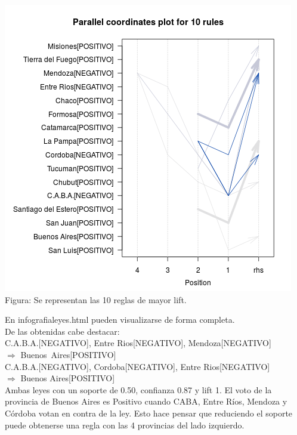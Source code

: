 \documentclass{endm}
\begin{document}
\begin{center}
\includegraphics[scale=0.5]{graficos/paracoordProvincias.png} \\
\scriptsize{Figura: Se representan las 10 reglas de mayor lift.}
\end{center} 

En infografialeyes.html pueden visualizarse de forma completa. \\

De las obtenidas cabe destacar: \\

C.A.B.A.[NEGATIVO], Entre Rios[NEGATIVO], Mendoza[NEGATIVO]\\ $\Longrightarrow$ Buenos\ Aires[POSITIVO] \\

{C.A.B.A.[NEGATIVO],                            Cordoba[NEGATIVO],                              Entre Rios[NEGATIVO]}\\ $\Longrightarrow$ {Buenos Aires[POSITIVO]}  \\


Ambas leyes con un soporte de 0.50, confianza 0.87 y lift 1. El voto de la provincia de Buenos Aires es Positivo cuando CABA, Entre Ríos, Mendoza y Córdoba votan en contra de la ley. Esto hace pensar que reduciendo el soporte puede obtenerse una regla con las 4 provincias del lado izquierdo. \\
\end{document}

